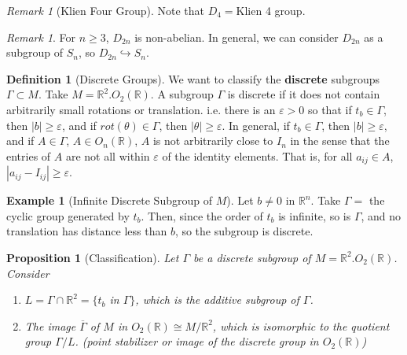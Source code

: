 \documentclass[12pt]{article}
\newtheorem{prop}[thm]{Proposition}
\theoremstyle{definition}
\newtheorem{defn}[thm]{Definition}
\newtheorem{eg}[thm]{Example}
\theoremstyle{remark}
\newtheorem{rmk}[thm]{Remark}
\numberwithin{equation}{section}
\newcommand\R{\mathbb R}    %
\newcommand\B[1]{\textbf{ #1}}
\begin{document}
\vspace{15pt}

\begin{rmk}[Klien Four Group]
        Note that $D_4 = $Klien 4 group.
\end{rmk}


\vspace{15pt}

\begin{rmk}
        For $n\geq 3$, $D_{2n}$ is non-abelian. In general, we can consider $D_{2n}$ as a subgroup of $S_n$, so $D_{2n} \hookrightarrow S_n$.
\end{rmk}

\vspace{15pt}


\begin{defn}[Discrete Groups]
        We want to classify the \B{discrete} subgroups $\Gamma \subset M$. Take $M = \R^2.O_2(\R)$. A subgroup $\Gamma$ is discrete if it does not contain arbitrarily small rotations or translation. i.e. there is an $\varepsilon > 0$ so that if $t_b \in \Gamma$, then $|b| \geq \varepsilon$, and if $rot(\theta)\in \Gamma$, then $|\theta| \geq \varepsilon$. In general, if $t_b \in \Gamma$, then $|b| \geq \varepsilon$, and if $A \in \Gamma$, $A \in O_n(\R)$, $A$ is not arbitrarily close to $I_n$ in the sense that the entries of $A$ are not all within $\varepsilon$ of the identity elements. That is, for all $a_{ij} \in A$, $|a_{ij} - I_{ij}| \geq \varepsilon$.
\end{defn}


\vspace{15pt}

\begin{eg}[Infinite Discrete Subgroup of $M$]
        Let $b \neq 0$ in $\R^n$. Take $\Gamma = $ the cyclic group generated by $t_b$. Then, since the order of $t_b$ is infinite, so is $\Gamma$, and no translation has distance less than $b$, so the subgroup is discrete.
\end{eg}


\vspace{15pt}

\begin{prop}[Classification]
        Let $\Gamma$ be a discrete subgroup of $M = \R^2.O_2(\R)$. Consider \begin{enumerate}
                \item $L = \Gamma \cap \R^2 = \{t_b$ in $\Gamma\}$, which is the additive subgroup of $\Gamma$.
                \item The image $\overline{\Gamma}$ of $M$ in $O_2(\R) \cong M/\R^2$, which is isomorphic to the quotient group $\Gamma/L$. (point stabilizer or image of the discrete group in $O_2(\R)$)
        \end{enumerate}
\end{prop}
\end{document}
